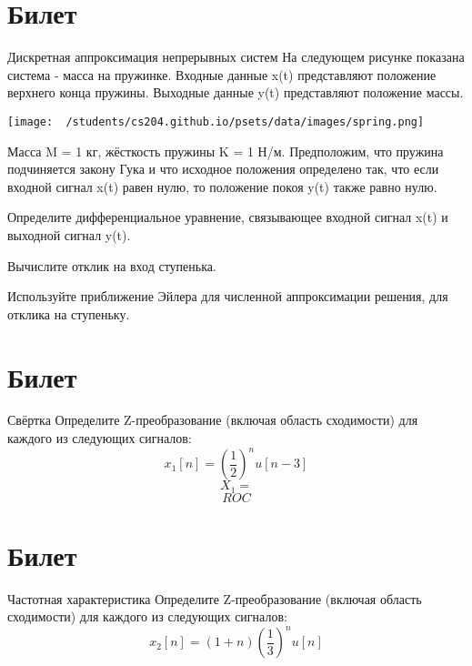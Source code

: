 \documentclass{exam}
\begin{document}
\newpage
\section{Билет}
\begin{questions}
	\question 
Дискретная аппроксимация непрерывных систем 
	\question 
На следующем рисунке показана система - масса на пружинке.
Входные данные x(t) представляют положение верхнего конца пружины.
Выходные данные y(t) представляют положение массы.

	\texttt{[image: ~/students/cs204.github.io/psets/data/images/spring.png]}

Масса M = 1 кг, жёсткость пружины K = 1 Н/м.
Предположим, что пружина подчиняется закону Гука и что исходное 
положения определено так, что если входной сигнал x(t) равен нулю, 
то положение покоя y(t) также равно нулю.


		Определите дифференциальное уравнение, связывающее входной сигнал x(t) и выходной сигнал y(t).  
	
Вычислите отклик на вход ступенька.

Используйте приближение Эйлера для численной аппроксимации решения, 
для отклика на ступеньку.
\end{questions}
\vspace{15pt}

\newpage
\section{Билет}
\begin{questions}
	\question 
Свёртка 
	\question 
Определите Z-преобразование (включая область сходимости) 
для каждого из следующих сигналов:
	\[
		x_1[n]=\left(\frac{1}{2}\right)^nu[n-3]
	\]
		\[X_1=\]
		\[ROC\]
	
\end{questions}
\vspace{15pt}

\newpage
\section{Билет}
\begin{questions}
	\question 
Частотная характеристика 
	\question 
Определите Z-преобразование (включая область сходимости) 
для каждого из следующих сигналов:
	\[
		x_2[n]=(1+n)\left(\frac{1}{3}\right)^nu[n]
		\]
\end{questions}
\vspace{15pt}
\end{document}
